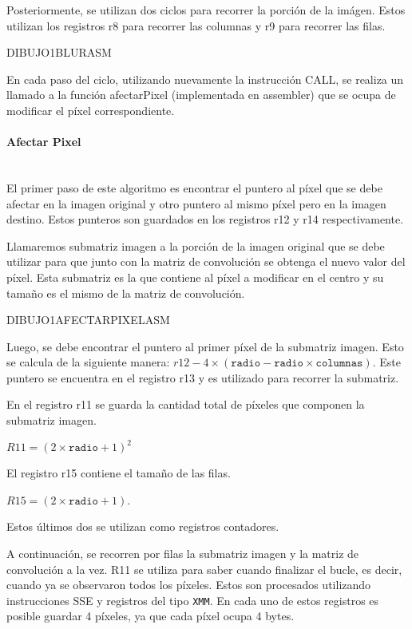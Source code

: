       Posteriormente, se utilizan dos ciclos para recorrer la porción de la imágen. Estos utilizan los registros r8 para recorrer las columnas y r9 para recorrer las filas.
  
      DIBUJO1BLURASM
      
      En cada paso del ciclo, utilizando nuevamente la instrucción CALL, se realiza un llamado a la función afectarPixel (implementada en assembler) que se ocupa de modificar el píxel correspondiente. 

      \paragraph{Afectar Pixel}\mbox{} \\
        El primer paso de este algoritmo es encontrar el puntero al píxel que se debe afectar en la imagen original y otro puntero al mismo píxel pero en la imagen destino. Estos punteros son guardados en los registros r12 y r14 respectivamente.   

        Llamaremos submatriz imagen a la porción de la imagen original que se debe utilizar para que junto con la matriz de convolución se obtenga el nuevo valor del píxel. Esta submatriz es la que contiene al píxel a modificar en el centro y su tamaño es el mismo de la matriz de convolución. 
        
        DIBUJO1AFECTARPIXELASM

        Luego, se debe encontrar el puntero al primer píxel de la submatriz imagen. Esto se calcula de la siguiente manera: $r12 - 4 \times (\mathtt{radio} - \mathtt{radio} \times \mathtt{columnas})$. Este puntero se encuentra en el registro r13 y es utilizado para recorrer la submatriz. 

        En el registro r11 se guarda la cantidad total de píxeles que componen la submatriz imagen. 

              $R11 = (2 \times \mathtt{radio} + 1)^{2}$  
        
        El registro r15 contiene el tamaño de las filas.
        
              $R15 =(2 \times \mathtt{radio}  + 1)$.

        Estos últimos dos se utilizan como registros contadores.

        A continuación, se recorren por filas la submatriz imagen y la matriz de convolución a la vez. R11 se utiliza para saber cuando finalizar el bucle, es decir, cuando ya se observaron todos los píxeles. Estos son procesados utilizando instrucciones SSE y registros del tipo \texttt{XMM}. En cada uno de estos registros es posible guardar 4 píxeles, ya que cada píxel ocupa 4 bytes. 

